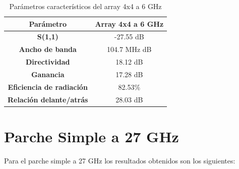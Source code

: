 \begin{table}[H]
  
   
   \small %
   \centering %
   \begin{tabular}{c c} %
   \toprule[\heavyrulewidth]\toprule[\heavyrulewidth]
   \textbf{Parámetro} & \textbf{Array 4x4 a 6 GHz} \\ 
   \midrule
   \textbf{S(1,1)} & -27.55 dB \\
   \textbf{Ancho de banda} & 104.7 MHz dB \\
   \textbf{Directividad} & 18.12 dB \\
   \textbf{Ganancia} & 17.28 dB \\
   \textbf{Eficiencia de radiación} & 82.53\% \\
   \textbf{Relación delante/atrás} & 28.03 dB \\

   \bottomrule[\heavyrulewidth] 
   \end{tabular}
   
   \caption{Parámetros característicos del array 4x4 a 6 GHz} 
   \label{tab:res4x42}
\end{table}



























\section{Parche Simple a 27 GHz}
\par Para el parche simple a 27 GHz los resultados obtenidos son los siguientes:

